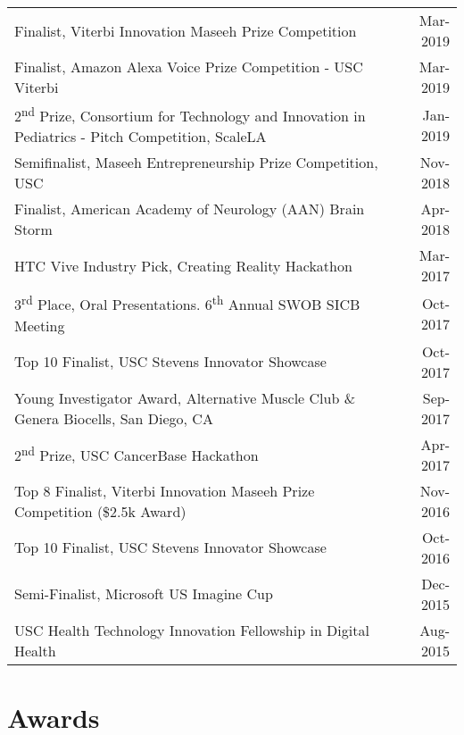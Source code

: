 \documentclass[10pt,a4paper]{article}
\newcommand{\ts}{\textsuperscript}
\begin{document}
  \vspace*{1mm}\noindent\begin{tabularx}{17cm}{X r}
    Finalist, Viterbi Innovation Maseeh Prize Competition & Mar-2019 \\ %
    Finalist, Amazon Alexa Voice Prize Competition - USC Viterbi & Mar-2019 \\ %
    2\ts{nd} Prize, Consortium for Technology and Innovation in Pediatrics - Pitch Competition, ScaleLA & Jan-2019\\ 
    Semifinalist, Maseeh Entrepreneurship Prize Competition, USC & Nov-2018 \\ %
    Finalist, American Academy of Neurology (AAN) Brain Storm & Apr-2018 \\%
    HTC Vive Industry Pick, Creating Reality Hackathon & Mar-2017 \\%
    3\ts{rd} Place, Oral Presentations. 6\ts{th} Annual SWOB SICB Meeting & Oct-2017\\ %
    Top 10 Finalist, USC Stevens Innovator Showcase & Oct-2017 \\%
    Young Investigator Award, Alternative Muscle Club \& Genera Biocells, San Diego, CA & Sep-2017\\ %
    2\ts{nd} Prize, USC CancerBase Hackathon & Apr-2017 \\ %
    Top 8 Finalist, Viterbi Innovation Maseeh Prize Competition (\$2.5k Award) & Nov-2016 \\ %
    Top 10 Finalist, USC Stevens Innovator Showcase & Oct-2016 \\ %
    Semi-Finalist, Microsoft US Imagine Cup & Dec-2015 \\
    USC Health Technology Innovation Fellowship in Digital Health & Aug-2015\\

  \end{tabularx}

\vspace*{2mm}\section*{Awards}
  
\end{document}
